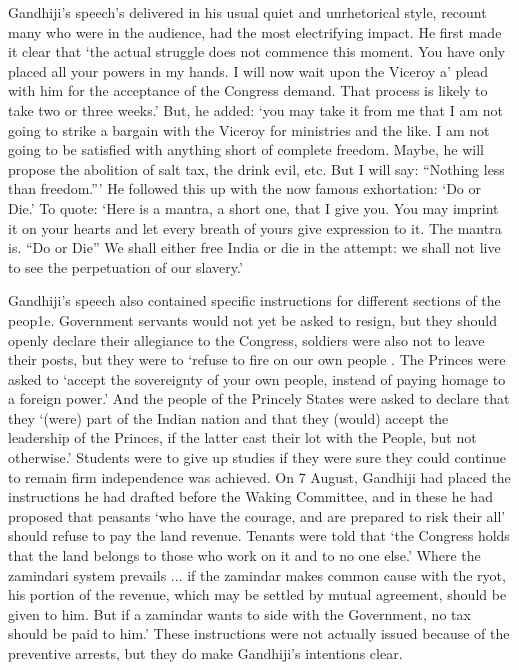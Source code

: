 \begin{multicols}{2}
Gandhiji's speech's delivered in his usual quiet and unrhetorical style, recount many who were in the audience, had the most electrifying impact. He first made it clear that `the actual struggle does not commence this moment. You have only placed all your powers in my hands. I will now wait upon the Viceroy a' plead with him for the acceptance of the Congress demand. That process is likely to take two or three weeks.' But, he added: `you may take it from me that I am not going to strike a bargain with the Viceroy for ministries and the like. I am not going to be satisfied with anything short of complete freedom. Maybe, he will propose the abolition of salt tax, the drink evil, etc. But I will say: ``Nothing less than freedom.''' He followed this up with the now famous exhortation: `Do or Die.' To quote: `Here is a mantra, a short one, that I give you. You may imprint it on your hearts and let every breath of yours give expression to it. The mantra is. ``Do or Die'' We shall either free India or die in the attempt: we shall not live to see the perpetuation of our slavery.'

Gandhiji's speech also contained specific instructions for different sections of the peop1e. Government servants would not yet be asked to resign, but they should openly declare their allegiance to the Congress, soldiers were also not to leave their posts, but they were to `refuse to fire on our own people . The Princes were asked to `accept the sovereignty of your own people, instead of paying homage to a foreign power.' And the people of the Princely States were asked to declare that they `(were) part of the Indian nation and that they (would) accept the leadership of the Princes, if the latter cast their lot with the People, but not otherwise.' Students were to give up studies if they were sure they could continue to remain firm independence was achieved. On 7 August, Gandhiji had placed the instructions he had drafted before the Waking Committee, and in these he had proposed that peasants `who have the courage, and are prepared to risk their all' should refuse to pay the land revenue. Tenants were told that `the Congress holds that the land belongs to those who work on it and to no one else.' Where the zamindari system prevails ... if the zamindar makes common cause with the ryot, his portion of the revenue, which may be settled by mutual agreement, should be given to him. But if a zamindar wants to side with the Government, no tax should be paid to him.' These instructions were not actually issued because of the preventive arrests, but they do make Gandhiji's intentions clear.


\end{multicols}
